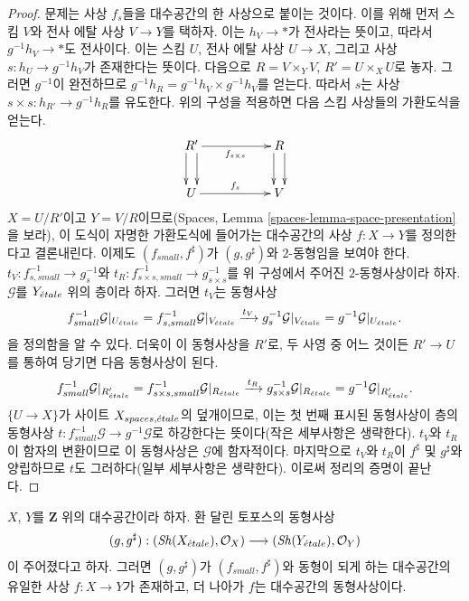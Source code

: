 \begin{proof}
\medskip\noindent
문제는 사상 $f_s$들을 대수공간의 한 사상으로 붙이는 것이다. 이를 위해
먼저 스킴 $V$와 전사 에탈 사상 $V \to Y$를 택하자. 이는
$h_V \to *$가 전사라는 뜻이고, 따라서 $g^{-1}h_V \to *$도 전사이다.
이는 스킴 $U$, 전사 에탈 사상 $U \to X$, 그리고 사상
$s : h_U \to g^{-1}h_V$가 존재한다는 뜻이다. 다음으로
$R = V \times_Y V$, $R' = U \times_X U$로 놓자. 그러면
$g^{-1}$이 완전하므로
$g^{-1}h_R = g^{-1}h_V \times g^{-1}h_V$를 얻는다. 따라서 $s$는 사상
$s \times s : h_{R'} \to g^{-1}h_R$를 유도한다. 위의 구성을 적용하면
다음 스킴 사상들의 가환도식을 얻는다.
$$
\xymatrix{
R' \ar@<1ex>[d] \ar@<-1ex>[d] \ar[rr]_{f_{s \times s}} & &
R \ar@<1ex>[d] \ar@<-1ex>[d] \\
U \ar[rr]^{f_s} & &
V
}
$$
$X = U/R'$이고 $Y = V/R$이므로(Spaces, Lemma
\ref{spaces-lemma-space-presentation}을 보라), 이 도식이 자명한
가환도식에 들어가는 대수공간의 사상 $f : X \to Y$를 정의한다고
결론내린다. 이제도 $(f_{small}, f^\sharp)$가 $(g, g^\sharp)$와
$2$-동형임을 보여야 한다. $t_V : f_{s, small}^{-1} \to g_s^{-1}$와
$t_R : f_{s \times s, small}^{-1} \to g_{s \times s}^{-1}$를 위 구성에서
주어진 $2$-동형사상이라 하자. $\mathcal{G}$를 $Y_{\acute{e}tale}$ 위의 층이라
하자. 그러면 $t_V$는 동형사상
$$
f_{small}^{-1}\mathcal{G}|_{U_{\acute{e}tale}}
=
f_{s, small}^{-1}\mathcal{G}|_{V_{\acute{e}tale}}
\xrightarrow{t_V}
g_s^{-1}\mathcal{G}|_{V_{\acute{e}tale}}
=
g^{-1}\mathcal{G}|_{U_{\acute{e}tale}}.
$$
을 정의함을 알 수 있다. 더욱이 이 동형사상을 $R'$로, 두 사영 중 어느
것이든 $R' \to U$를 통하여 당기면 다음 동형사상이 된다.
$$
f_{small}^{-1}\mathcal{G}|_{R'_{\acute{e}tale}}
=
f_{s \times s, small}^{-1}\mathcal{G}|_{R_{\acute{e}tale}}
\xrightarrow{t_R}
g_{s \times s}^{-1}\mathcal{G}|_{R_{\acute{e}tale}}
=
g^{-1}\mathcal{G}|_{R'_{\acute{e}tale}}.
$$
$\{U \to X\}$가 사이트 $X_{spaces, {\acute{e}tale}}$의 덮개이므로, 이는 첫
번째 표시된 동형사상이 층의 동형사상
$t : f_{small}^{-1}\mathcal{G} \to g^{-1}\mathcal{G}$로 하강한다는
뜻이다(작은 세부사항은 생략한다). $t_V$와 $t_R$이 함자의 변환이므로
이 동형사상은 $\mathcal{G}$에 함자적이다. 마지막으로 $t_V$와 $t_R$이
$f^\sharp$ 및 $g^\sharp$와 양립하므로 $t$도 그러하다(일부 세부사항은
생략한다). 이로써 정리의 증명이 끝난다.
\end{proof}

\begin{lemma}
\label{lemma-isomorphism-ringed-topoi}
$X$, $Y$를 $\mathbf{Z}$ 위의 대수공간이라 하자. 환 달린 토포스의
동형사상
$$
(g, g^\sharp) :
(\mathop{\mathit{Sh}}\nolimits(X_{\acute{e}tale}), \mathcal{O}_X)
\longrightarrow
(\mathop{\mathit{Sh}}\nolimits(Y_{\acute{e}tale}), \mathcal{O}_Y)
$$
이 주어졌다고 하자. 그러면 $(g, g^\sharp)$가
$(f_{small}, f^\sharp)$와 동형이 되게 하는 대수공간의 유일한 사상
$f : X \to Y$가 존재하고, 더 나아가 $f$는 대수공간의 동형사상이다.
\end{lemma}

